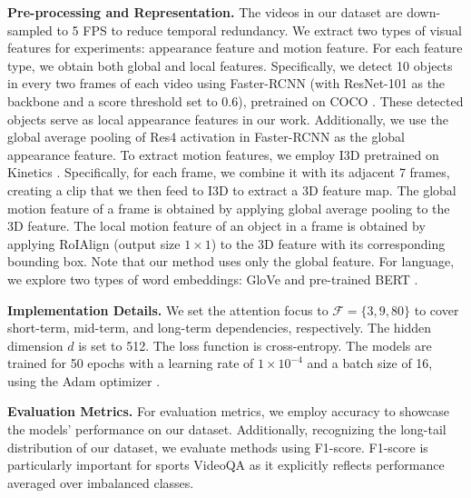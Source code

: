 \noindent\textbf{Pre-processing and Representation.} The videos in our dataset are down-sampled to 5 FPS to reduce temporal redundancy. We extract two types of visual features for experiments: appearance feature and motion feature. For each feature type, we obtain both global and local features.
Specifically, we detect 10 objects in every two frames of each video using Faster-RCNN \citep{ren2015faster} (with ResNet-101 \citep{he2016deep} as the backbone and a score threshold set to 0.6), pretrained on COCO \citep{lin2014microsoft}. These detected objects serve as local appearance features in our work. Additionally, we use the global average pooling of Res4 activation in Faster-RCNN as the global appearance feature.
To extract motion features, we employ I3D \citep{carreira2017quo} pretrained on Kinetics \citep{carreira2017quo}. Specifically, for each frame, we combine it with its adjacent 7 frames, creating a clip that we then feed to I3D to extract a 3D feature map. The global motion feature of a frame is obtained by applying global average pooling to the 3D feature. The local motion feature of an object in a frame is obtained by applying RoIAlign \citep{he2017mask} (output size $1\times 1$) to the 3D feature with its corresponding bounding box. Note that our method uses only the global feature.
For language, we explore two types of word embeddings: GloVe \citep{pennington2014glove} and pre-trained BERT \citep{devlin2018bert}.
 
\noindent\textbf{Implementation Details.} We set the attention focus to $\mathcal{F}=\{3,9,80\}$ to cover short-term, mid-term, and long-term dependencies, respectively. The hidden dimension $d$ is set to 512. The loss function is cross-entropy. The models are trained for 50 epochs with a learning rate of $1\times 10^{-4}$ and a batch size of 16, using the Adam optimizer \citep{kingma2014adam}.

\noindent\textbf{Evaluation Metrics.} For evaluation metrics, we employ accuracy to showcase the models' performance on our dataset. Additionally, recognizing the long-tail distribution of our dataset, we evaluate methods using F1-score. F1-score is particularly important for sports VideoQA as it explicitly reflects performance averaged over imbalanced classes.

